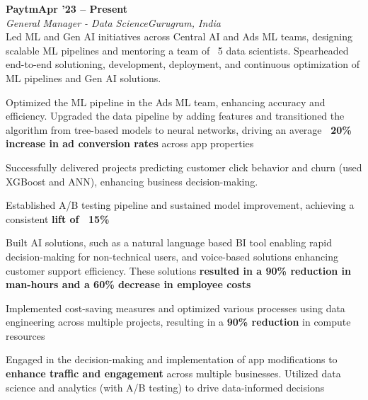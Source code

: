 \documentclass[letterpaper,10pt]{article}
\newcommand{\heading}[2]{
  \hspace{10pt}#1\hfill#2\\
}
\newcommand{\headingBf}[2]{
  \heading{\textbf{#1}}{\textbf{#2}}
}
\newcommand{\headingIt}[2]{
  \heading{\textit{#1}}{\textit{#2}}
}
\newenvironment{resume_list}{
  \vspace{-7pt}
  \begin{itemize}[itemsep=-2px, parsep=1pt, leftmargin=30pt]
}{
  \end{itemize}
}
\begin{document}
  \headingBf{Paytm}{Apr '23 -- Present}
  \headingIt{General Manager - Data Science}{Gurugram, India}
  Led ML and Gen AI initiatives across Central AI and Ads ML teams, designing scalable ML pipelines and mentoring a team of ~5 data scientists. Spearheaded end-to-end solutioning, development, deployment, and continuous optimization of ML pipelines and Gen AI solutions.
  \begin{resume_list}
    \item Optimized the ML pipeline in the Ads ML team, enhancing accuracy and efficiency. Upgraded the data pipeline by adding features and transitioned the algorithm from tree-based models to neural networks, driving an average \textbf{~20\% increase in ad conversion rates} across app properties
    \item Successfully delivered projects predicting customer click behavior and churn (used XGBoost and ANN), enhancing business decision-making.
    \item Established A/B testing pipeline and sustained model improvement, achieving a consistent \textbf{lift of ~15\%}
    \item Built AI solutions, such as a natural language based BI tool enabling rapid decision-making for non-technical users, and voice-based solutions enhancing customer support efficiency. These solutions \textbf{resulted in a 90\% reduction in man-hours and a 60\% decrease in employee costs}
    \item Implemented cost-saving measures and optimized various processes using data engineering across multiple projects, resulting in a \textbf{90\% reduction} in compute resources
    \item Engaged in the decision-making and implementation of app modifications to \textbf{enhance traffic and engagement} across multiple businesses. Utilized data science and analytics (with A/B testing) to drive data-informed decisions
  \end{resume_list}
\end{document}
